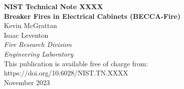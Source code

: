 \documentclass[12pt]{article}
\newcommand{\pubnumber}{XXXX}
\newcommand{\DOI}{https://doi.org/10.6028/NIST.TN.XXXX}
\newcommand{\monthyear}{November 2023}
\begin{document}
\begin{titlepage}
\begin{flushright}
\LARGE{\textbf{NIST Technical Note \pubnumber}}\\
\vfill
\Huge{\textbf{Breaker Fires in Electrical Cabinets (BECCA-Fire)}}\\
\vfill
\normalsize Kevin McGrattan \\ Isaac Leventon \\
\textit{Fire Research Division}\\
\textit{Engineering Laboratory}\\
\vfill
\normalsize This publication is available free of charge from:\\
\DOI\\
\vfill
\normalsize \monthyear
\vfill


\end{flushright}
\end{titlepage}
\end{document}

